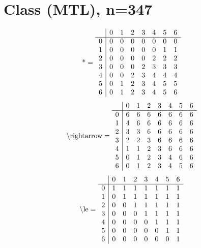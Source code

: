 \documentclass[11pt]{article}
\begin{document}
\section{Class (MTL), n=347}
\[\text{*} = 
\begin{array}{r | r r r r r r r}
 & 0 & 1 & 2 & 3 & 4 & 5 & 6 \\ \hline
0 & 0 & 0 & 0 & 0 & 0 & 0 & 0 \\
1 & 0 & 0 & 0 & 0 & 0 & 1 & 1 \\
2 & 0 & 0 & 0 & 0 & 2 & 2 & 2 \\
3 & 0 & 0 & 0 & 2 & 3 & 3 & 3 \\
4 & 0 & 0 & 2 & 3 & 4 & 4 & 4 \\
5 & 0 & 1 & 2 & 3 & 4 & 5 & 5 \\
6 & 0 & 1 & 2 & 3 & 4 & 5 & 6 \\
\end{array}
\]
\[\text{\textbackslash rightarrow} = 
\begin{array}{r | r r r r r r r}
 & 0 & 1 & 2 & 3 & 4 & 5 & 6 \\ \hline
0 & 6 & 6 & 6 & 6 & 6 & 6 & 6 \\
1 & 4 & 6 & 6 & 6 & 6 & 6 & 6 \\
2 & 3 & 3 & 6 & 6 & 6 & 6 & 6 \\
3 & 2 & 2 & 3 & 6 & 6 & 6 & 6 \\
4 & 1 & 1 & 2 & 3 & 6 & 6 & 6 \\
5 & 0 & 1 & 2 & 3 & 4 & 6 & 6 \\
6 & 0 & 1 & 2 & 3 & 4 & 5 & 6 \\
\end{array}
\]
\[\text{\textbackslash le} = 
\begin{array}{r | r r r r r r r}
 & 0 & 1 & 2 & 3 & 4 & 5 & 6 \\ \hline
0 & 1 & 1 & 1 & 1 & 1 & 1 & 1 \\
1 & 0 & 1 & 1 & 1 & 1 & 1 & 1 \\
2 & 0 & 0 & 1 & 1 & 1 & 1 & 1 \\
3 & 0 & 0 & 0 & 1 & 1 & 1 & 1 \\
4 & 0 & 0 & 0 & 0 & 1 & 1 & 1 \\
5 & 0 & 0 & 0 & 0 & 0 & 1 & 1 \\
6 & 0 & 0 & 0 & 0 & 0 & 0 & 1 \\
\end{array}
\]
\end{document}
